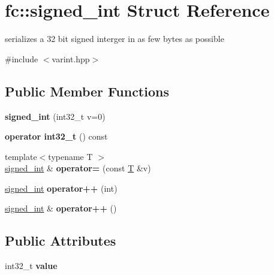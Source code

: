 \hypertarget{structfc_1_1signed__int}{}\section{fc\+:\+:signed\+\_\+int Struct Reference}
\label{structfc_1_1signed__int}


serializes a 32 bit signed interger in as few bytes as possible  




{\ttfamily \#include $<$varint.\+hpp$>$}

\subsection*{Public Member Functions}
\begin{DoxyCompactItemize}
\item 
\mbox{\label{structfc_1_1signed__int_ac853d7dd06867757c29ba1573b36751e}} 
{\bfseries signed\+\_\+int} (int32\+\_\+t v=0)
\item 
\mbox{\label{structfc_1_1signed__int_a6ea2311849bad77422f7aba6673b9485}} 
{\bfseries operator int32\+\_\+t} () const
\item 
\mbox{\label{structfc_1_1signed__int_aa7e55a3e2ac2eeb8cd981a0ead082083}} 
{\footnotesize template$<$typename T $>$ }\\\mbox{\hyperlink{structfc_1_1signed__int}{signed\+\_\+int}} \& {\bfseries operator=} (const \mbox{\hyperlink{struct_t}{T}} \&v)
\item 
\mbox{\label{structfc_1_1signed__int_a6816b4fc686a86c686aee6eaf015f189}} 
\mbox{\hyperlink{structfc_1_1signed__int}{signed\+\_\+int}} {\bfseries operator++} (int)
\item 
\mbox{\label{structfc_1_1signed__int_a7a6130915715615a98b9cc7c1f4761e8}} 
\mbox{\hyperlink{structfc_1_1signed__int}{signed\+\_\+int}} \& {\bfseries operator++} ()
\end{DoxyCompactItemize}
\subsection*{Public Attributes}
\begin{DoxyCompactItemize}
\item 
\mbox{\label{structfc_1_1signed__int_a594de3c9df8e11911cce18eb8ae15d08}} 
int32\+\_\+t {\bfseries value}
\end{DoxyCompactItemize}
